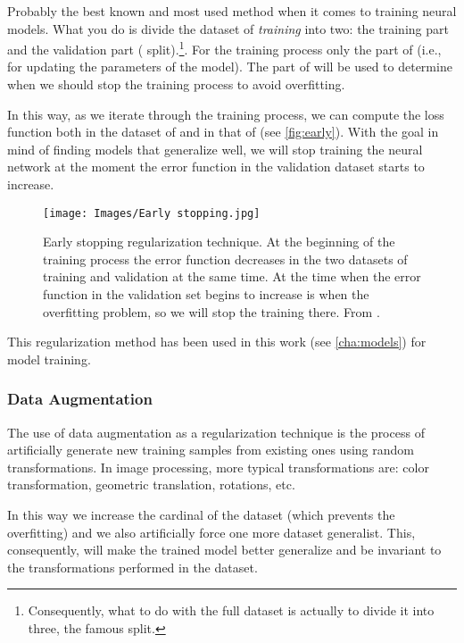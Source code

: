 Probably the best known and most used method when it comes to training neural
models. What you do is divide the dataset of \emph{training} into two: the
training part and the validation part (
split).\footnote{Consequently, what to do with the full dataset is actually to
  divide it into three, the famous  split.}. For the
training process only the part of  (i.e., for updating the
parameters of the model). The part of  will be used to determine when
we should stop the training process to avoid overfitting.

In this way, as we iterate through the training process, we can compute the
loss function both in the dataset of  and in that of 
(see \vref{fig:early}). With the goal in mind of finding models that generalize
well, we will stop training the neural network at the moment the error function
in the validation dataset starts to increase.

\begin{figure}[ht]
  \centering
  \texttt{[image: Images/Early stopping.jpg]}
  \caption[Early stopping regularization technique]{Early stopping
    regularization technique. At the beginning of the training process the
    error function decreases in the two datasets of training and validation at
    the same time. At the time when the error function in the validation set
    begins to increase is when the overfitting problem, so we will stop the
    training there. From
    .}\label{fig:early}
\end{figure}

This regularization method has been used in this work (see \vref{cha:models})
for model training.

\subsubsection{Data Augmentation}

The use of data augmentation as a regularization technique is the process of
artificially generate new training samples from existing ones using random
transformations. In image processing, more typical transformations are: color
transformation, geometric translation, rotations, etc.

In this way we increase the cardinal of the dataset (which prevents the
overfitting) and we also artificially force one more dataset generalist. This,
consequently, will make the trained model better generalize and be invariant to
the transformations performed in the dataset.

